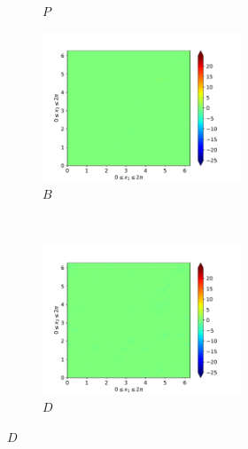 \begin{figure}[H]
\begin{subfigure}{0.45\textwidth}
        \caption{$P$}
    \end{subfigure}
    \newline
    \begin{subfigure}{0.45\textwidth}
        \includegraphics[height=1.75in]{media/run-cds-65/B-ke-1440}
        \caption{$B$}
    \end{subfigure}
    ~
    \begin{subfigure}{0.45\textwidth}
        \includegraphics[height=1.75in]{media/run-cds-65/D-ke-1440}
        \caption{$D$}
    \end{subfigure}
\end{figure}

